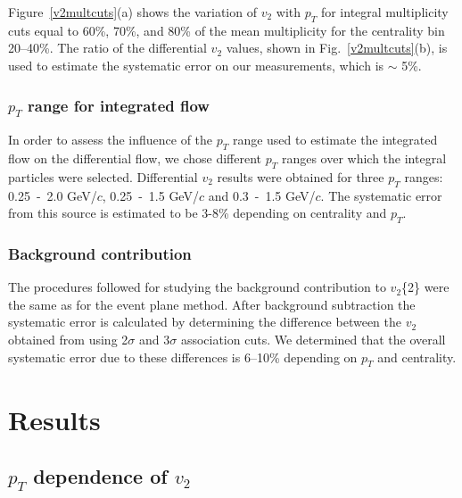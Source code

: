 \documentclass[aps,prc,superscriptaddress,showpacs,floatfix,twocolumn]{revtex4}
\newcommand \gevc{GeV/$c$\xspace}
\newcommand \pt{\mbox{$p_T$}\xspace}
\begin{document}
Figure~\ref{v2multcuts}(a) shows the variation of $v_2$ with \pt for 
integral multiplicity cuts equal to 60\%, 70\%, and 80\% of the mean 
multiplicity for the centrality bin 20--40\%. The ratio of the differential 
$v_2$ values, shown in Fig.~\ref{v2multcuts}(b), is used to estimate the 
systematic error on our measurements, which is $\sim$ 5\%.

\subsubsection{\pt range for integrated flow}

In order to assess the influence of the \pt range used to estimate the 
integrated flow on the differential flow, we chose different \pt ranges 
over which the integral particles were selected. Differential $v_2$ results 
were obtained for three \pt ranges: 0.25~-~2.0 \gevc, 0.25~-~1.5 \gevc and 
0.3~-~1.5 \gevc. The systematic error from this source is estimated to be 
3-8\% depending on centrality and \pt.

\subsubsection{Background contribution}

The procedures followed for studying the background contribution to 
$v_2$\{2\} were the same as for the event plane method. After background 
subtraction the systematic error is calculated by determining the 
difference between the $v_2$ obtained from using 2$\sigma$ and 3$\sigma$ 
association cuts. We determined that the overall systematic error due to 
these differences is 6--10\% depending on \pt and centrality.


\section{Results\label{sec:results}}

\subsection{\pt dependence of $v_2$}
\end{document}
